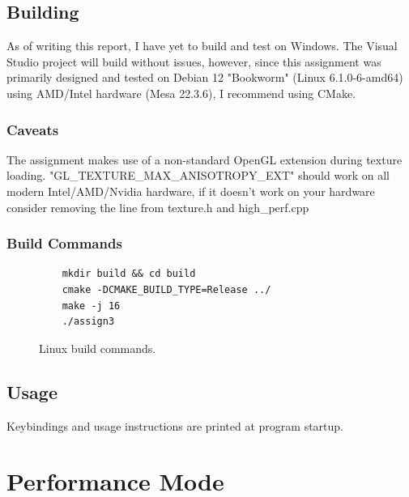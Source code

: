 \documentclass[]{report}
\begin{document}
\section{Building}
As of writing this report, I have yet to build and test on Windows. The Visual Studio project will build without issues, however, since this assignment was primarily designed and tested on Debian 12 "Bookworm" (Linux 6.1.0-6-amd64) using AMD/Intel hardware (Mesa 22.3.6), I recommend using CMake. 
\subsection{Caveats}
The assignment makes use of a non-standard OpenGL extension during texture loading. "GL\_TEXTURE\_MAX\_ANISOTROPY\_EXT" should work on all modern Intel/AMD/Nvidia hardware, if it doesn't work on your hardware consider removing the line from texture.h and high\_perf.cpp
\subsection{Build Commands}
\begin{figure}[H]
	\centering
	\begin{verbatim}
	mkdir build && cd build
	cmake -DCMAKE_BUILD_TYPE=Release ../
	make -j 16
	./assign3
	\end{verbatim}
	\caption{Linux build commands.}
\end{figure}
\section{Usage}
Keybindings and usage instructions are printed at program startup.

\chapter{Performance Mode}\label{chap:hp}
\end{document}
